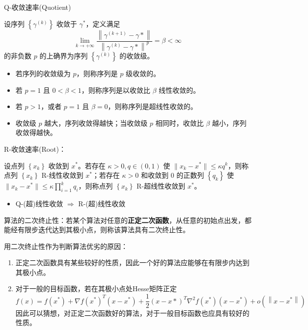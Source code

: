 \begin{remark}
    Q-收敛速率(Quotient)

    设序列 $\left\{\gamma^{(k)}\right\}$ 收敛于 $\gamma^*$，定义满足 \[\lim _{k \rightarrow+\infty} \frac{\left\|\gamma^{(k+1)}-\gamma *\right\|}{\left\|\gamma^{(k)}-\gamma *\right\|^{p}}=\beta<\infty\] 的非负数 $p$ 的上确界为序列 $\left\{\gamma^{(k)}\right\}$ 的收敛级。
    \begin{itemize}
        \item 若序列的收敛级为 $p$，则称序列是 $p$ 级收敛的。
        \item 若 $p = 1$ 且 $0 < \beta < 1$，则称序列是以收敛比 $\beta$ 线性收敛的。
        \item 若 $p > 1$，或者 $p = 1$ 且 $\beta = 0$，则称序列是超线性收敛的。
        \item 收敛级 $p$ 越大，序列收敛得越快；当收敛级 $p$ 相同时，收敛比 $\beta$ 越小，序列收敛得越快。
    \end{itemize}
\end{remark}

\begin{remark}
    R-收敛速率(Root)：

    设点列 $\left\{x_k\right\}$ 收敛到 $x^*$。若存在 $\kappa>0, q \in(0,1)$ 使 $\|x_k - x^*\| \le \kappa q^k$，则称点列 $\left\{x_k\right\}$ R-线性收敛到 $x^*$；若存在 $\kappa > 0$ 和收敛到 $0$ 的正数列 $\left\{q_k\right\}$ 使 $\|x_k - x^*\| \le \kappa \prod_{i = 1}^k q_i$，则称点列 $\left\{x_k\right\}$ R-超线性收敛到 $x^*$。

    \begin{itemize}
        \item Q-(超)线性收敛 $\Longrightarrow$ R-(超)线性收敛
    \end{itemize}
\end{remark}

\begin{remark}
    算法的二次终止性：若某个算法对任意的\textbf{正定二次函数}，从任意的初始点出发，都能经有限步迭代达到其极小点，则称该算法具有二次终止性。
    
    用二次终止性作为判断算法优劣的原因：
    \begin{enumerate}
        \item 正定二次函数具有某些较好的性质，因此一个好的算法应能够在有限步内达到其极小点。
        \item 对于一般的目标函数，若在其极小点处Hesse矩阵正定\[f(x) =f\left(x^{*}\right)+\nabla f\left(x^{*}\right)^{T}\left(x-x^{*}\right) 
        +\frac{1}{2}(x-x *)^{T} \nabla^{2} f\left(x^{*}\right)\left(x-x^{*}\right)+o\left(\left\|x-x^{*}\right\|\right)\]
        因此可以猜想，对正定二次函数好的算法，对于一般目标函数也应具有较好的性质。
    \end{enumerate}
\end{remark}

